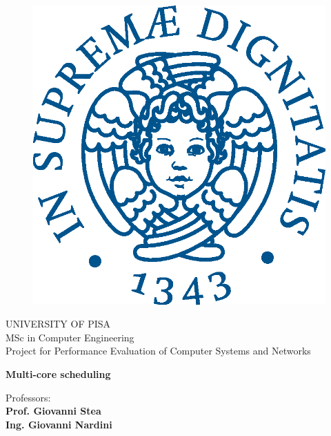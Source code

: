 \begin{titlepage}
\begin{figure}[!htb]
    \centering
    \includegraphics[keepaspectratio=true,scale=0.5]{images/Frontespizio/cherubinFrontespizio.eps}
\end{figure}

\begin{center}
    \LARGE{UNIVERSITY OF PISA}
    \vspace{5mm}
    \\ \large{MSc in Computer Engineering}
    \vspace{5mm}
    \\ \LARGE{Project for Performance Evaluation of Computer Systems and Networks}
\end{center}

\vspace{15mm}
\begin{center}
    {\LARGE{\bf Multi-core scheduling}}
    
    
\end{center}
\vspace{30mm}

\begin{minipage}[t]{0.47\textwidth}
	{\large{Professors:}{\normalsize\vspace{3mm}\bf\\ \large{Prof. Giovanni Stea}}{\normalsize\vspace{3mm}
               \bf\\ \large{Ing. Giovanni Nardini }}}


\end{minipage}
\end{titlepage}
